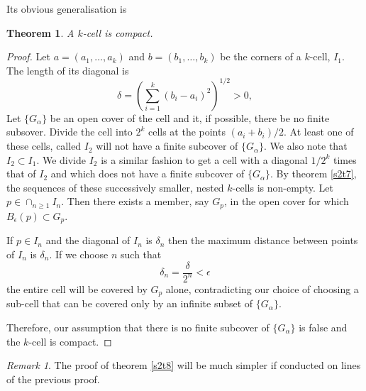 \documentclass{article}
\theoremstyle{plain}
\newtheorem{thm}{Theorem}
\numberwithin{thm}{section}
\theoremstyle{plain}
\numberwithin{prop}{section}
\theoremstyle{definition}
\numberwithin{defn}{section}
\theoremstyle{remark}
\newtheorem*{rem}{Remark}
\numberwithin{equation}{section}
\begin{document}
Its obvious generalisation is
\begin{thm}\label{s2t9}
A $k$-cell is compact.
\end{thm}
\begin{proof}
Let $a = (a_1, \ldots, a_k)$ and $b = (b_1, \ldots, b_k)$ be the corners of a
$k$-cell, $I_1$. The length of its diagonal is
\[
\delta = \left(\sum_{i=1}^k (b_i - a_i)^2\right)^{1/2} > 0,
\]
Let $\{G_\alpha\}$ be an open cover of the cell and it, if possible, there be no
finite subsover. Divide the cell into $2^k$ cells at the points $(a_i + b_i)/2$.
At least one of these cells, called $I_2$ will not have a finite subcover of
$\{G_\alpha\}$. We also note that $I_2 \subset I_1$. We divide $I_2$ is a 
similar fashion to get a cell with a diagonal $1/2^k$ times that of $I_2$ and
which does not have a finite subcover of $\{G_\alpha\}$. By theorem \ref{s2t7}, 
the sequences of these successively smaller, nested $k$-cells is non-empty. Let
$p \in \cap_{n \ge 1}I_n$. Then there exists a member, say $G_p$, in the open 
cover for which $B_\epsilon(p) \subset G_p$. 

If $p \in I_n$ and the diagonal of $I_n$ is $\delta_n$ then the maximum distance
between points of $I_n$ is $\delta_n$. If we choose $n$ such that 
\[
\delta_n = \frac{\delta}{2^{n}} < \epsilon
\]
the entire cell will be covered by $G_p$ alone, contradicting our choice of
choosing a sub-cell that can be covered only by an infinite subset of 
$\{G_\alpha\}$.

Therefore, our assumption that there is no finite subcover of $\{G_\alpha\}$
is false and the $k$-cell is compact.
\end{proof}

\begin{rem}
The proof of theorem \ref{s2t8} will be much simpler if conducted on lines of 
the previous proof.
\end{rem}
\end{document}
